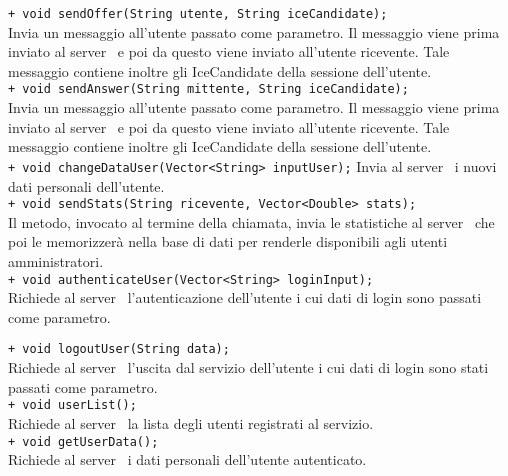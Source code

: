 {{\begin{sloppypar}
{{\begin{itemize}
{					\texttt{+ void sendOffer(String utente, String iceCandidate);}\\
					Invia un messaggio all'utente passato come parametro. Il messaggio viene prima inviato al server\g~ e poi da questo viene inviato all'utente ricevente. Tale messaggio contiene inoltre gli IceCandidate della sessione dell'utente.\\

					\texttt{+ void sendAnswer(String mittente, String iceCandidate);}\\
					Invia un messaggio all'utente passato come parametro. Il messaggio viene prima inviato al server\g~ e poi da questo viene inviato all'utente ricevente. Tale messaggio contiene inoltre gli IceCandidate della sessione dell'utente.\\

					\texttt{+ void changeDataUser(Vector<String> inputUser);}
					Invia al server\g~ i nuovi dati personali dell'utente.\\

					\texttt{+ void sendStats(String ricevente, Vector<Double> stats);}\\
					Il metodo, invocato al termine della chiamata, invia le statistiche al server\g~ che poi le memorizzerà nella base di dati per renderle disponibili agli utenti amministratori.\\

					\texttt{+ void authenticateUser(Vector<String> loginInput);}\\
					Richiede al server\g~ l'autenticazione dell'utente i cui dati di login sono passati come parametro.

					\texttt{+ void logoutUser(String data);}\\
					Richiede al server\g~ l'uscita dal servizio dell'utente i cui dati di login sono stati passati come parametro.\\

					\texttt{+ void userList();}\\
					Richiede al server\g~ la lista degli utenti registrati al servizio.\\

					\texttt{+ void getUserData();}\\
					Richiede al server\g~ i dati personali dell'utente autenticato.\\	

}
\end{itemize}}}
\end{sloppypar}}}

